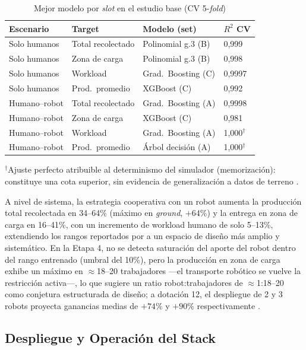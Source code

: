 \documentclass[conference]{IEEEtran}
\begin{document}
\begin{table}[H]
\caption{Mejor modelo por \textit{slot} en el estudio base (CV 5-\textit{fold}) \cite{garcia2026}}
\label{tab:bestmodels}
\centering\small
\begin{tabular}{@{}llll@{}}
\toprule
\textbf{Escenario} & \textbf{Target} & \textbf{Modelo (set)} & \textbf{$R^2$ CV} \\
\midrule
Solo humanos & Total recolectado & Polinomial g.3 (B) & 0{,}999 \\
Solo humanos & Zona de carga & Polinomial g.3 (B) & 0{,}998 \\
Solo humanos & Workload & Grad.\ Boosting (C) & 0{,}9997 \\
Solo humanos & Prod.\ promedio & XGBoost (C) & 0{,}992 \\
Humano--robot & Total recolectado & Grad.\ Boosting (A) & 0{,}9998 \\
Humano--robot & Zona de carga & XGBoost (C) & 0{,}981 \\
Humano--robot & Workload & Grad.\ Boosting (A) & 1{,}000$^\dagger$ \\
Humano--robot & Prod.\ promedio & Árbol decisión (A) & 1{,}000$^\dagger$ \\
\bottomrule
\end{tabular}

\vspace{2pt}
{\footnotesize $^\dagger$Ajuste perfecto atribuible al determinismo del simulador (memorización): constituye una cota superior, sin evidencia de generalización a datos de terreno \cite{garcia2026}.}
\end{table}

A nivel de sistema, la estrategia cooperativa con un robot aumenta la producción total recolectada en 34--64\% (máximo en \textit{ground}, $+64\%$) y la entrega en zona de carga en 16--41\%, con un incremento de workload humano de solo 5--13\%, extendiendo los rangos reportados por \cite{vasconez2022} a un espacio de diseño más amplio y sistemático. En la Etapa 4, no se detecta saturación del aporte del robot dentro del rango entrenado (umbral del 10\%), pero la producción en zona de carga exhibe un máximo en $\approx$18--20 trabajadores —el transporte robótico se vuelve la restricción activa—, lo que sugiere un ratio robot:trabajadores de $\approx$1:18--20 como conjetura estructurada de diseño; a dotación 12, el despliegue de 2 y 3 robots proyecta ganancias medias de $+74\%$ y $+90\%$ respectivamente \cite{garcia2026}.

\subsection{Despliegue y Operación del Stack}
\end{document}
